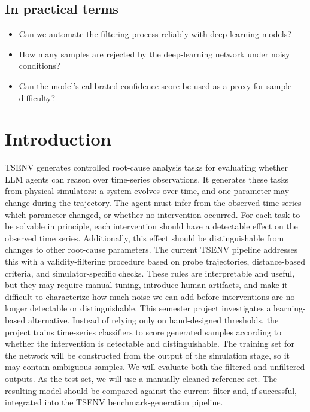 \documentclass[11pt]{article}
\begin{document}
\subsection*{In practical terms}

\begin{itemize}
    \item Can we automate the \name{} filtering process reliably with deep-learning models?
    \item How many samples are rejected by the deep-learning network under noisy conditions?
    \item Can the model’s calibrated confidence score be used as a proxy for sample difficulty?
\end{itemize}

\section*{Introduction}
TSENV generates controlled root-cause analysis tasks for evaluating whether LLM agents can reason over time-series observations.
It generates these tasks from physical simulators: a system evolves over time, and one parameter may change during the trajectory. 
The agent must infer from the observed time series which parameter changed, or whether no intervention occurred.
For each task to be solvable in principle, each intervention should have a detectable effect on the observed time series. 
Additionally, this effect should be distinguishable from changes to other root-cause parameters.
The current TSENV pipeline addresses this with a validity-filtering procedure based on probe trajectories, distance-based criteria, and simulator-specific checks. 
These rules are interpretable and useful, but they may require manual tuning, introduce human artifacts, and make it difficult to characterize how much noise we can add before interventions are no longer detectable or distinguishable.
This semester project investigates a learning-based alternative. 
Instead of relying only on hand-designed thresholds, the project trains time-series classifiers to score generated samples according to whether the intervention is detectable and distinguishable. 
The training set for the network will be constructed from the output of the \name{} simulation stage, so it may contain ambiguous samples.
We will evaluate both the filtered and unfiltered outputs.
As the test set, we will use a manually cleaned reference set.
The resulting model should be compared against the current filter and, if successful, integrated into the TSENV benchmark-generation pipeline.
\end{document}

